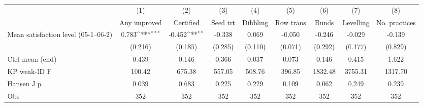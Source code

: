 {
\def\sym#1{\ifmmode^{#1}\else\(^{#1}\)\fi}
\begin{tabular}{l*{8}{c}}
\toprule
                    &\multicolumn{1}{c}{(1)}&\multicolumn{1}{c}{(2)}&\multicolumn{1}{c}{(3)}&\multicolumn{1}{c}{(4)}&\multicolumn{1}{c}{(5)}&\multicolumn{1}{c}{(6)}&\multicolumn{1}{c}{(7)}&\multicolumn{1}{c}{(8)}\\
                    &\multicolumn{1}{c}{Any improved}&\multicolumn{1}{c}{Certified}&\multicolumn{1}{c}{Seed trt}&\multicolumn{1}{c}{Dibbling}&\multicolumn{1}{c}{Row trans}&\multicolumn{1}{c}{Bunds}&\multicolumn{1}{c}{Levelling}&\multicolumn{1}{c}{No. practices}\\
\midrule
Mean satisfaction level (05-1--06-2)&       0.783\sym{***}&      -0.452\sym{**} &      -0.338         &       0.069         &      -0.050         &      -0.246         &      -0.029         &      -0.139         \\
                    &     (0.216)         &     (0.185)         &     (0.285)         &     (0.110)         &     (0.071)         &     (0.292)         &     (0.177)         &     (0.829)         \\
\midrule
Ctrl mean (end)     &       0.439         &       0.146         &       0.366         &       0.037         &       0.073         &       0.146         &       0.415         &       1.622         \\
KP weak-ID F        &      100.42         &      675.38         &      557.05         &      508.76         &      396.85         &     1832.48         &     3755.31         &     1317.70         \\
Hansen J p          &       0.039         &       0.683         &       0.225         &       0.229         &       0.109         &       0.062         &       0.249         &       0.239         \\
Obs                 &         352         &         352         &         352         &         352         &         352         &         352         &         352         &         352         \\
\bottomrule
\end{tabular}
}
